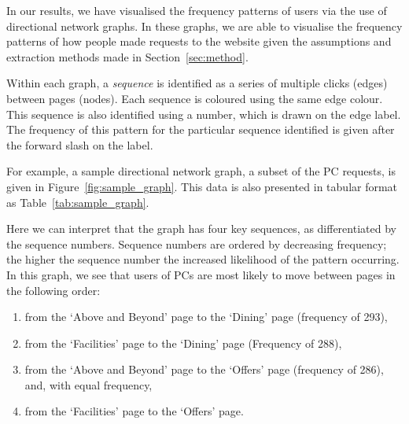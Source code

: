 
In our results, we have visualised the frequency patterns of users via the use of directional network graphs. In these graphs, we are able to visualise the frequency patterns of how people made requests to the website given the assumptions and extraction methods made in Section~\ref{sec:method}.

Within each graph, a \textit{sequence} is identified as a series of multiple clicks (edges) between pages (nodes). Each sequence is coloured using the same edge colour. This sequence is also identified using a number, which is drawn on the edge label. The frequency of this pattern for the particular sequence identified is given after the forward slash on the label.

For example, a sample directional network graph, a subset of the PC requests, is given in Figure~\ref{fig:sample_graph}. This data is also presented in tabular format as Table~\ref{tab:sample_graph}.

Here we can interpret that the graph has four key sequences, as differentiated by the sequence numbers. Sequence numbers are ordered by decreasing frequency; the higher the sequence number the increased likelihood of the pattern occurring. In this graph, we see that users of PCs are most likely to move between pages in the following order:

\begin{enumerate}
  \item from the `Above and Beyond' page to the `Dining' page (frequency of 293),
  \item from the `Facilities' page to the `Dining' page (Frequency of 288),
  \item from the `Above and Beyond' page to the `Offers' page (frequency of 286), and, with equal frequency,
  \item from the `Facilities' page to the `Offers' page.
\end{enumerate} 

\newpage



